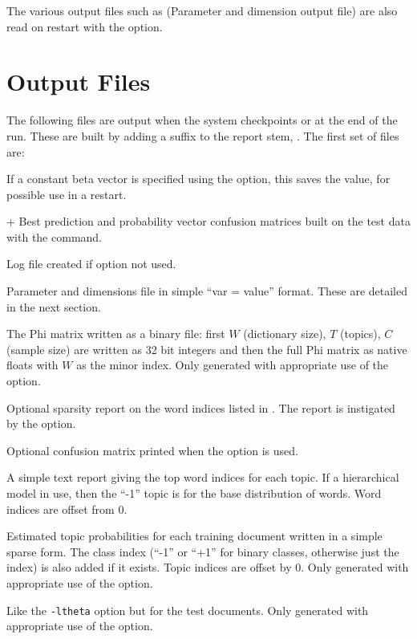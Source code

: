 \documentclass[a4paper,english]{article}
\begin{document}
The various output files such as
 (Parameter and dimension output file)
are also read on restart with the  option.

\section{Output Files}

The following files are output when the system checkpoints 
or at the end of the run.
These are built by adding a suffix to the report stem,
.
The first set of files are:
\begin{Description}\setlength{\itemsep}{0cm}
\item[\File{RepStem.beta}]  If a constant beta vector is specified
using the  option, this saves
   the value, for possible use in a restart.
\item[\File{RepStem.cnfs}+\File{RepStem.pcnfs}]  
Best prediction and probability vector confusion matrices
built on the test data with the 
 command.
\item[\File{RepStem.log}] Log file created if  option not used.
\item[\File{RepStem.par}] Parameter and dimensions file in simple ``var = value'' format.  These are detailed in the next section.
\item[\File{RepStem.phi}] The Phi matrix written as a binary file:
first $W$ (dictionary size), $T$ (topics), 
$C$ (sample size) are written as 32 bit integers and
then the full Phi matrix as native floats with $W$ as the minor index.
Only generated with appropriate use of the
 option.
\item[\File{RepStem.smap}] Optional sparsity report on the 
word indices listed in .
The report is instigated by the
 option.
\item[\File{RepStem.tbyc}]  Optional confusion matrix printed when
the  option is used.
\item[\File{RepStem.top}] A simple text report giving the top word indices
  for each topic.  If a hierarchical model in use, then the
``-1'' topic is for the base distribution of words.
Word indices are offset from 0.
\item[\File{RepStem.theta}] Estimated topic probabilities 
for each training document
written in a simple sparse form.  The class index
(``-1'' or ``+1'' for binary classes, otherwise just the index)
is also added if it exists.
Topic indices are offset by 0.
Only generated with appropriate use of the
 option.
\item[\File{RepStem.testprob}] 
Like the \texttt{-ltheta} option but for the test documents.
Only generated with appropriate use of the
 option.
\end{Description}
\end{document}
